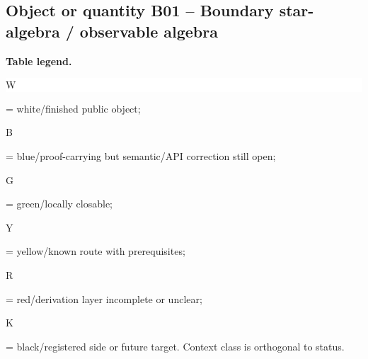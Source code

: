\subsection*{Object or quantity B01 -- Boundary star-algebra /\allowbreak{} observable algebra}
\hypertarget{objproof:B01}{}
\par\smallskip\noindent\begin{minipage}{0.99\linewidth}\footnotesize\raggedright\textbf{Table legend.} \colorbox{white}{\strut W} = white/finished public object; \colorbox{cyan!20}{\strut B} = blue/proof-carrying but semantic/API correction still open; \colorbox{green!18}{\strut G} = green/locally closable; \colorbox{yellow!25}{\strut Y} = yellow/known route with prerequisites; \colorbox{red!20}{\strut R} = red/derivation layer incomplete or unclear; \colorbox{black!18}{\strut K} = black/registered side or future target. Context class is orthogonal to status.\end{minipage}\par\vspace{0.25em}

